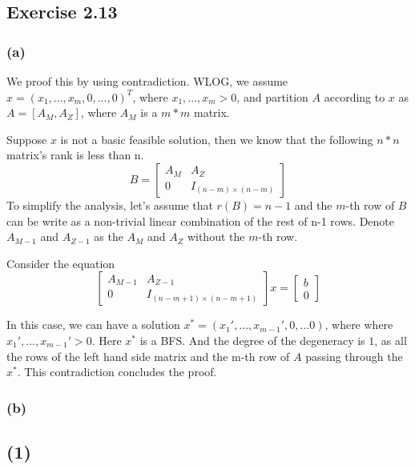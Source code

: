 \documentclass[11pt]{article}
\begin{document}
    \hypertarget{exercise-2.13}{%
\subsection{Exercise 2.13}\label{exercise-2.13}}

\hypertarget{a}{%
\subsubsection{(a)}\label{a}}

We proof this by using contradiction. WLOG, we assume
\(x=(x_1,...,x_m,0,...,0)^T\), where \(x_1,...,x_m >0\), and partition
\(A\) according to \(x\) as \(A=[A_M,A_Z]\), where \(A_M\) is a \(m*m\)
matrix.

Suppose \(x\) is not a basic feasible solution, then we know that the
following \(n*n\) matrix's rank is less than n. \[
B=
\begin{bmatrix}
A_M & A_Z\\
0 & I_{(n-m)\times (n-m)}
\end{bmatrix}
\] To simplify the analysis, let's assume that \(r(B)=n-1\) and the
\(m\)-th row of \(B\) can be write as a non-trivial linear combination
of the rest of n-1 rows. Denote \(A_{M-1}\) and \(A_{Z-1}\) as the
\(A_M\) and \(A_Z\) without the \(m\)-th row.

Consider the equation \[
\begin{bmatrix}
A_{M-1} & A_{Z-1}\\
0 & I_{(n-m+1)\times (n-m+1)}
\end{bmatrix}x=\begin{bmatrix}b \\ 0\end{bmatrix}
\]

In this case, we can have a solution
\(x^*=(x_1',...,x_{m-1}', 0,...0)\), where where
\(x_1',...,x_{m-1}' >0\). Here \(x^*\) is a BFS. And the degree of the
degeneracy is \(1\), as all the rows of the left hand side matrix and
the m-th row of \(A\) passing through the \(x^*\). This contradiction
concludes the proof.

\hypertarget{b}{%
\subsubsection{(b)}\label{b}}

    \hypertarget{section}{%
\subsection{(1)}\label{section}}
\end{document}
